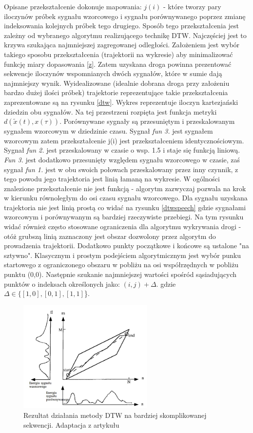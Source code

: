 Opisane przekształcenie dokonuje mapowania: $j(i)$ - które tworzy pary iloczynów próbek sygnału wzorcowego i sygnału porównywanego poprzez zmianę indeksowania kolejnych próbek tego drugiego. Sposób tego przekształcenia jest zależny od wybranego algorytmu realizującego technikę DTW. Najczęściej jest to krzywa szukająca najmniejszej zagregowanej odległości. Założeniem jest wybór takiego sposobu przekształcenia (trajektorii na wykresie) aby minimalizować funkcję miary dopasowania \ref{z}. Zatem uzyskana droga powinna prezentować sekwencje iloczynów wspomnianych dwóch sygnałów, które w sumie dają najmniejszy wynik. Wyidealizowane (idealnie dobrana droga przy założeniu bardzo dużej ilości próbek) trajektorie reprezentujące takie przekształcenia zaprezentowane są na rysunku \ref{dtw}. Wykres reprezentuje iloczyn kartezjański dziedzin obu sygnałów. Na tej przestrzeni rozpięta jest funkcja metryki $d(\tilde{x}(t), x(\tau))$. Porównywane sygnały są przesuniętym i przeskalowanym sygnałem wzorcowym w dziedzinie czasu. Sygnał \textit{fun 3.} jest sygnałem wzorcowym zatem przekształcenie j(i) jest przekształceniem identycznościowym. Sygnał \textit{fun 2.} jest przeskalowany w czasie o wsp. 1.5 i staje się funkcją liniową. \textit{Fun 3.} jest dodatkowo przesunięty względem sygnału wzorcowego w czasie, zaś sygnał \textit{fun 1.} jest w obu swoich połowach przeskalowany przez inny czynnik, z tego powodu jego trajektoria jest linią łamaną na wykresie. W ogólności znalezione przekształcenie nie jest funkcją - algorytm zazwyczaj pozwala na krok w kierunku równoległym do osi czasu sygnału wzorcowego. Dla sygnału uzyskana trajektoria nie jest linią prostą co widać na rysunku \ref{dtwspeech} gdzie sygnałami wzorcowym i porównywanym są bardziej rzeczywiste przebiegi. Na tym rysunku widać również często stosowane ograniczenia dla algorytmu wykrywania drogi - otóż grubszą linią zaznaczony jest obszar dozwolony przez algorytm do prowadzenia trajektorii. Dodatkowo punkty początkowe i końcowe są ustalone "na sztywno". Klasycznym i prostym podejściem algorytmicznym jest wybór punku startowego z ograniczonego obszaru w pobliżu na osi współrzędnych w pobliżu punktu (0,0). Następnie szukanie najmniejszej wartości spośród sąsiadujących punktów o indeksach określonych jako: $(i, j) + \Delta.$ gdzie $ \Delta \in \{ [1,0], [0, 1], [1, 1]$\}. 
\begin{figure}[ht!]
  \centering
    \includegraphics[width=0.6\textwidth]{dtwspeech.jpg}
    \caption{Rezultat działania metody DTW na bardziej skomplikowanej sekwencji. Adaptacja z artykułu \cite{campbell}}
\end{figure}
